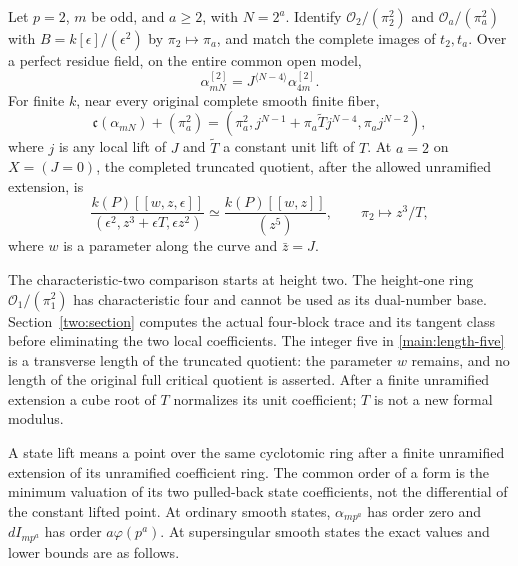 \begin{theorem}
\label{main:two}
Let $p=2$, $m$ be odd, and $a\ge2$, with $N=2^a$.
Identify $\mathcal O_2/(\pi_2^2)$ and $\mathcal O_a/(\pi_a^2)$
with $B=k[\epsilon]/(\epsilon^2)$ by $\pi_2\mapsto\pi_a$,
and match the complete images of $t_2,t_a$. Over a perfect residue
field, on the entire common open model,
\begin{equation}
 \alpha_{mN}^{[2]}=J^{\langle N-4\rangle}\alpha_{4m}^{[2]}.
 \label{main:two-form}
\end{equation}
For finite $k$, near every original complete smooth finite fiber,
\begin{equation}
 \mathfrak c(\alpha_{mN})+(\pi_a^2)
 =(\pi_a^2,j^{N-1}+\pi_a\widetilde Tj^{N-4},\pi_a j^{N-2}),
 \label{main:two-ideal}
\end{equation}
where $j$ is any local lift of $J$ and $\widetilde T$ a constant
unit lift of $T$. At $a=2$ on $X=(J=0)$, the completed truncated
quotient, after the allowed unramified extension, is
\begin{equation}
 \frac{k(P)[[w,z,\epsilon]]}{(\epsilon^2,z^3+\epsilon T,\epsilon z^2)}
 \simeq\frac{k(P)[[w,z]]}{(z^5)},\qquad
 \pi_2\longmapsto z^3/T,
 \label{main:length-five}
\end{equation}
where $w$ is a parameter along the curve and $\bar z=J$.
\end{theorem}

The characteristic-two comparison starts at height two. The height-one
ring $\mathcal O_1/(\pi_1^2)$ has characteristic four and cannot be
used as its dual-number base. Section~\ref{two:section} computes the
actual four-block trace and its tangent class before eliminating the
two local coefficients. The integer five in \eqref{main:length-five}
is a transverse length of the truncated quotient: the parameter $w$
remains, and no length of the original full critical quotient is
asserted. After a finite unramified extension a cube root of $T$
normalizes its unit coefficient; $T$ is not a new formal modulus.

A state lift means a point over the same cyclotomic ring after a finite
unramified extension of its unramified coefficient ring. The common
order of a form is the minimum valuation of its two pulled-back state
coefficients, not the differential of the constant lifted point.
At ordinary smooth states, $\alpha_{mp^a}$ has order zero and
$dI_{mp^a}$ has order $a\varphi(p^a)$. At supersingular smooth states
the exact values and lower bounds are as follows.

